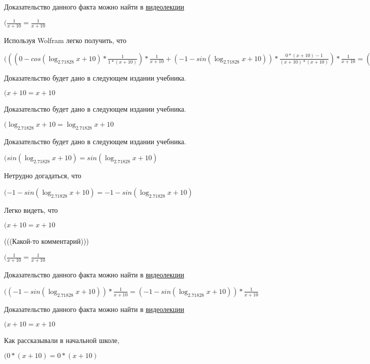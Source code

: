 \documentclass[12pt,a4paper,fleqn]{article}
\theoremstyle{definition}
\begin{document}
Доказательство данного факта можно найти в \href{https://www.youtube.com/watch?v=dQw4w9WgXcQ}{видеолекции}

$(\frac{ 1 }{ x  +  10 }
 = \frac{ 1 }{ x  +  10 }
$

Используя Wolfram легко получить, что

$((( 0  - cos(\log_{ 2.71828 }{ x  +  10 }) * \frac{ 1 }{ 1  * ( x  +  10 )}
) * \frac{ 1 }{ x  +  10 }
 + ( -1  - sin(\log_{ 2.71828 }{ x  +  10 })) * \frac{ 0  * ( x  +  10 ) -  1 }{( x  +  10 ) * ( x  +  10 )}
) * \frac{ 1 }{ x  +  10 }
 = (( 0  - cos(\log_{ 2.71828 }{ x  +  10 }) * \frac{ 1 }{ 1  * ( x  +  10 )}
) * \frac{ 1 }{ x  +  10 }
 + ( -1  - sin(\log_{ 2.71828 }{ x  +  10 })) * \frac{ 0  * ( x  +  10 ) -  1 }{( x  +  10 ) * ( x  +  10 )}
) * \frac{ 1 }{ x  +  10 }
$

Доказательство будет дано в следующем издании учебника.

$( x  +  10  =  x  +  10 $

Доказательство будет дано в следующем издании учебника.

$(\log_{ 2.71828 }{ x  +  10 } = \log_{ 2.71828 }{ x  +  10 }$

Доказательство будет дано в следующем издании учебника.

$(sin(\log_{ 2.71828 }{ x  +  10 }) = sin(\log_{ 2.71828 }{ x  +  10 })$

Нетрудно догадаться, что

$( -1  - sin(\log_{ 2.71828 }{ x  +  10 }) =  -1  - sin(\log_{ 2.71828 }{ x  +  10 })$

Легко видеть, что

$( x  +  10  =  x  +  10 $

(((Какой-то комментарий)))

$(\frac{ 1 }{ x  +  10 }
 = \frac{ 1 }{ x  +  10 }
$

Доказательство данного факта можно найти в \href{https://www.youtube.com/watch?v=dQw4w9WgXcQ}{видеолекции}

$(( -1  - sin(\log_{ 2.71828 }{ x  +  10 })) * \frac{ 1 }{ x  +  10 }
 = ( -1  - sin(\log_{ 2.71828 }{ x  +  10 })) * \frac{ 1 }{ x  +  10 }
$

Доказательство данного факта можно найти в \href{https://www.youtube.com/watch?v=dQw4w9WgXcQ}{видеолекции}

$( x  +  10  =  x  +  10 $

Как рассказывали в начальной школе,

$( 0  * ( x  +  10 ) =  0  * ( x  +  10 )$
\end{document}
